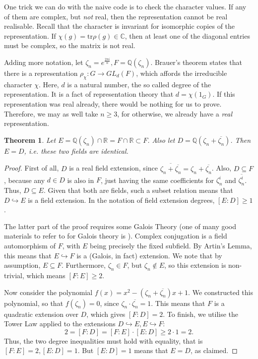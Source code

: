 \documentclass[11pt]{article}
\newtheorem{theorem}{Theorem}[section]
\begin{document}
One trick we can do with the naive code is to check the character values. If any of them are
complex, but \textit{not} real, then the representation cannot be real realisable. Recall that
the character is invariant for isomorphic copies of the representation. If
$\chi(g) = \text{tr}\rho(g) \in \mathbb{C}$, then at least one of the diagonal entries
must be complex, so the matrix is not real.

Adding more notation, let $\zeta_n = e^{\frac{2\pi i}{n}}, F=\mathbb{Q}(\zeta_n)$.
Brauer's theorem \cite[(10.3)]{ISAACS} states that there is a
representation $\rho_\chi: G \rightarrow GL_d(F)$, which affords the irreducible
character $\chi$. Here, $d$ is a natural number, the so called degree of the
representation. It is a fact of representation theory that $d = \chi(1_G)$.
If this representation was real already, there would be nothing for us to prove.
Therefore, we may as well take $n \geq 3$, for otherwise, we already have a
\textit{real} representation.

\begin{theorem}
  Let $E = \mathbb{Q}(\zeta_n) \cap \mathbb{R} = F \cap \mathbb{R} \subset F$.
  Also let $D = \mathbb{Q}(\zeta_n + \overline{\zeta_n})$.
  Then $E = D$, i.e. these two fields are identical.
\end{theorem}
\begin{proof}
  First of all, $D$ is a real field extension, since $\overline{\zeta_n + \overline{\zeta_n}} = \zeta_n + \overline{\zeta_n}$.
  Also, $D \subseteq F$, because any $d \in D$ is also in $F$, just having the same coefficients for $\zeta_n^i$ and $\overline{\zeta_n^i}$.
  Thus, $D \subseteq E$. Given that both are fields, such a subset relation means that $D \hookrightarrow E$ is a field extension.
  In the notation of field extension degrees, $[E:D] \geq 1$.

  The latter part of the proof requires some Galois Theory (one of many good
  materials to refer to for Galois theory is \cite{milne2022}).
  Complex conjugation is a field automorphism of $F$, with $E$ being precisely
  the fixed subfield.   By Artin's Lemma, this means that $E \hookrightarrow F$
  is a (Galois, in fact) extension. We note that by assumption, $E \subseteq F$.
  Furthermore, $\zeta_n \in F$, but $\zeta_n \notin E$, so this extension is
  non-trivial, which means $[F:E] \geq 2$.

  Now consider the polynomial $f(x) = x^2 - (\zeta_n + \overline{\zeta_n})x + 1$. We constructed this
  polynomial, so that $f(\zeta_n) = 0$, since $\zeta_n \cdot \overline{\zeta_n} = 1$. This means
  that $F$ is a quadratic extension over $D$, which gives $[F:D] = 2$. To finish, we utilise the Tower Law
  applied to the extensions $D \hookrightarrow E, E \hookrightarrow F$:
  \[2 = [F:D] = [F:E] \cdot [E:D] \geq 2 \cdot 1 = 2.\]
  Thus, the two degree inequalities must hold with equality, that is $[F:E] = 2, [E:D] = 1$.
  But $[E:D] = 1$ means that $E = D$, as claimed.
\end{proof}
\end{document}
